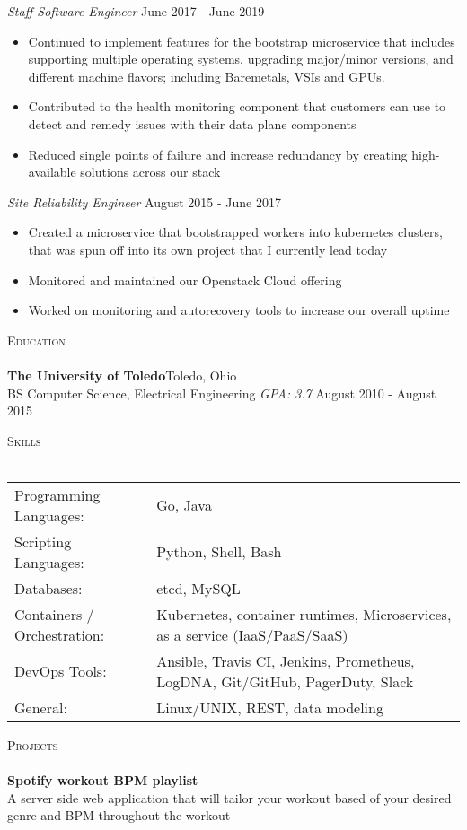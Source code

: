 \documentclass[a4paper]{article}
\newcommand{\lineunder} {
    \vspace*{-8pt} \\
    \hspace*{-18pt} \hrulefill \\
}
\newcommand{\header} [1] {
    {\hspace*{-18pt}\vspace*{6pt} \textsc{#1}}
    \vspace*{-6pt} \lineunder
}
\begin{document}
\textit{Staff Software Engineer} \hfill June 2017 - June 2019\\
\vspace{-1mm}
\begin{itemize} \itemsep 1pt
	\item Continued to implement features for the bootstrap microservice that includes supporting multiple operating systems, upgrading major/minor versions, and different machine flavors; including Baremetals, VSIs and GPUs.
	\item Contributed to the health monitoring component that customers can use to detect and remedy issues with their data plane components
	\item Reduced single points of failure and increase redundancy by creating high-available solutions across our stack
\end{itemize}
\textit{Site Reliability Engineer} \hfill August 2015 - June 2017\\
\vspace{-1mm}
\begin{itemize} \itemsep 1pt
	\item Created a microservice that bootstrapped workers into kubernetes clusters, that was spun off into its own project that I currently lead today
	\item Monitored and maintained our Openstack Cloud offering
	\item Worked on monitoring and autorecovery tools to increase our overall uptime
\end{itemize}

\header{Education}
\textbf{The University of Toledo}\hfill Toledo, Ohio\\
BS Computer Science, Electrical Engineering \textit{GPA: 3.7} \hfill August 2010 - August 2015\\
\vspace{2mm}

\header{Skills}
\begin{tabular}{ l l }
	Programming Languages:      & Go, Java                                                                      \\
	Scripting Languages:        & Python, Shell, Bash                                                           \\
	Databases:                  & etcd, MySQL                                                                   \\
	Containers / Orchestration: & Kubernetes, container runtimes, Microservices, as a service (IaaS/PaaS/SaaS)  \\
	DevOps Tools:               & Ansible, Travis CI, Jenkins, Prometheus, LogDNA, Git/GitHub, PagerDuty, Slack \\
	General:                    & Linux/UNIX, REST, data modeling                                               \\
\end{tabular}
\vspace{2mm}

\header{Projects}
{\textbf{Spotify workout BPM playlist}}\\
A server side web application that will tailor your workout based of your desired genre and BPM throughout the workout\\
\vspace*{2mm}



\
\end{document}
